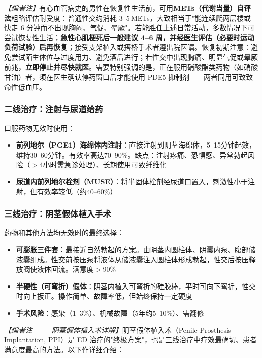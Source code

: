 \noindent\textit{【编者注】}有心血管病史的男性在恢复性生活前，可用\textbf{METs（代谢当量）自评法}粗略评估耐受度：普通性交约消耗 3--5\,METs，大致相当于"能连续爬两层楼或快走 6 分钟而不出现胸闷、气促、晕厥"。若能胜任上述日常活动，多数情况下可尝试恢复性生活；\textbf{急性心肌梗死后一般建议 4--6 周，并经医生评估（必要时运动负荷试验）后再恢复}；接受支架植入或搭桥手术者遵出院医嘱。恢复初期注意：避免尝试陌生体位与过度用力、避免酒后进行；若性交中出现胸痛、明显气促或晕厥前兆，\textbf{立即停止并尽快就医}。需要特别强调的是，正在服用硝酸酯类药物（如硝酸甘油）者，须在医生确认停药窗口后才能使用 PDE5 抑制剂——两者同用可致致命性低血压。

\subsubsection{二线治疗：注射与尿道给药}

口服药物无效时使用：
\begin{itemize}[leftmargin=2cm]
	\item \textbf{前列地尔（PGE1）海绵体内注射}：直接注射到阴茎海绵体，5--15分钟起效，维持30--60分钟。有效率高达70--90\%。缺点：注射疼痛、恐惧感、异常勃起风险（$>$4小时需急诊处理）、长期使用可致纤维化
	\item \textbf{尿道内前列地尔栓剂（MUSE）}：将半固体栓剂经尿道口置入，刺激性小于注射，但有效率较低（约40--60\%）
\end{itemize}

\subsubsection{三线治疗：阴茎假体植入手术}
\label{subsec:penile_prosthesis}

药物和其他方法均无效时的最终选择：
\begin{itemize}[leftmargin=2cm]
	\item \textbf{可膨胀三件套}：最接近自然勃起的方案。由阴茎内圆柱体、阴囊内泵、腹部储液囊组成。性交前按压泵将液体从储液囊注入圆柱体形成勃起，性交后按压释放阀使液体回流。满意度$>$90\%
	\item \textbf{半硬性（可弯折）假体}：阴茎内植入可弯折的硅胶棒，平时可向下弯折，性交时向上扳正。操作简单、故障率低，但始终保持一定硬度
	\item \textbf{手术风险}：感染（1--3\%）、机械故障（5年约5--10\%）、需翻修
\end{itemize}

\noindent\textit{【编者注 —— 阴茎假体植入术详解】}阴茎假体植入术（Penile Prosthesis Implantation, PPI）是 ED 治疗的"终极方案"，也是三线治疗中疗效最确切、患者满意度最高的方法。以下作详细介绍：

